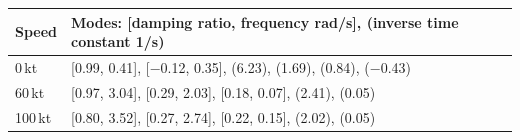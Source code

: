 \begin{tabular}{@{}lp{6.2cm}@{}}
\toprule
Speed & Modes: [damping ratio, frequency rad/s], (inverse time constant 1/s) \\
\midrule
0\,kt & [0.99, 0.41], [$-$0.12, 0.35], (6.23), (1.69), (0.84), ($-$0.43) \\
60\,kt & [0.97, 3.04], [0.29, 2.03], [0.18, 0.07], (2.41), (0.05) \\
100\,kt & [0.80, 3.52], [0.27, 2.74], [0.22, 0.15], (2.02), (0.05) \\
\bottomrule
\end{tabular}
